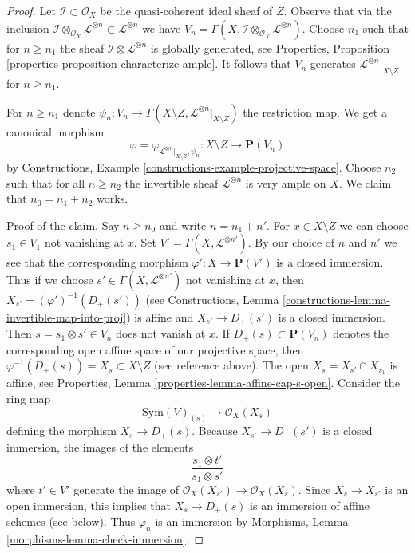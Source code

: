 \begin{proof}
Let $\mathcal{I} \subset \mathcal{O}_X$ be the quasi-coherent ideal sheaf of
$Z$. Observe that via the inclusion
$\mathcal{I} \otimes_{\mathcal{O}_X} \mathcal{L}^{\otimes n} \subset
\mathcal{L}^{\otimes n}$ we have
$V_n = \Gamma(X, \mathcal{I} \otimes_{\mathcal{O}_X} \mathcal{L}^{\otimes n})$.
Choose $n_1$ such that for $n \geq n_1$ the sheaf
$\mathcal{I} \otimes \mathcal{L}^{\otimes n}$ is globally generated, see
Properties, Proposition \ref{properties-proposition-characterize-ample}.
It follows that $V_n$ generates $\mathcal{L}^{\otimes n}|_{X \setminus Z}$
for $n \geq n_1$.

\medskip\noindent
For $n \geq n_1$ denote
$\psi_n : V_n \to
\Gamma(X \setminus Z, \mathcal{L}^{\otimes n}|_{X \setminus Z})$
the restriction map. We get a canonical morphism
$$
\varphi = \varphi_{\mathcal{L}^{\otimes n}|_{X \setminus Z}, \psi_n} :
X \setminus Z
\longrightarrow
\mathbf{P}(V_n)
$$
by Constructions, Example \ref{constructions-example-projective-space}.
Choose $n_2$ such that for all $n \geq n_2$ the invertible sheaf
$\mathcal{L}^{\otimes n}$ is very ample on $X$.
We claim that $n_0 = n_1 + n_2$ works.

\medskip\noindent
Proof of the claim. Say $n \geq n_0$ and write $n = n_1 + n'$.
For $x \in X \setminus Z$ we can choose $s_1 \in V_1$ not
vanishing at $x$. Set $V' = \Gamma(X, \mathcal{L}^{\otimes n'})$.
By our choice of $n$ and $n'$ we see that the corresponding morphism
$\varphi' : X \to \mathbf{P}(V')$ is a closed immersion. Thus if we choose
$s' \in \Gamma(X, \mathcal{L}^{\otimes n'})$ not vanishing at $x$,
then $X_{s'} = (\varphi')^{-1}(D_+(s'))$ (see
Constructions, Lemma \ref{constructions-lemma-invertible-map-into-proj})
is affine and $X_{s'} \to D_+(s')$ is a closed immersion.
Then $s = s_1 \otimes s' \in V_n$ does not vanish at $x$.
If $D_+(s) \subset \mathbf{P}(V_n)$ denotes the
corresponding open affine space of our projective space, then
$\varphi^{-1}(D_+(s)) = X_s \subset X \setminus Z$ (see reference above).
The open $X_s = X_{s'} \cap X_{s_1}$ is affine, see
Properties, Lemma \ref{properties-lemma-affine-cap-s-open}.
Consider the ring map
$$
\text{Sym}(V)_{(s)} \longrightarrow \mathcal{O}_X(X_s)
$$
defining the morphism $X_s \to D_+(s)$. Because $X_{s'} \to D_+(s')$
is a closed immersion, the images of the elements
$$
\frac{s_1 \otimes t'}{s_1 \otimes s'}
$$
where $t' \in V'$ generate the image of
$\mathcal{O}_X(X_{s'}) \to \mathcal{O}_X(X_s)$.
Since $X_s \to X_{s'}$ is an open immersion,
this implies that $X_s \to D_+(s)$ is an immersion of affine schemes
(see below). Thus $\varphi_n$ is an immersion by
Morphisms, Lemma \ref{morphisms-lemma-check-immersion}.


\end{proof}
